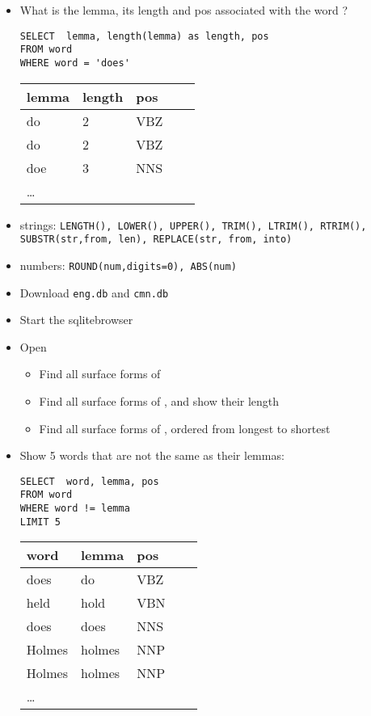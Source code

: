\documentclass[a4paper,landscape,headrule,footrule,xetex]{foils}
\begin{document}

\begin{itemize}\addtolength{\itemsep}{-1ex}
\item What is the lemma, its length and pos associated with the word ?
\begin{verbatim}
SELECT  lemma, length(lemma) as length, pos
FROM word
WHERE word = 'does'
\end{verbatim}
  \begin{tabular}{lllll}
    \textbf{lemma}  & \textbf{length}  &  \textbf{pos} \\ \hline
    do  & 2 &  VBZ \\
    do  & 2 &  VBZ \\
    doe & 3 &  NNS \\
    \ldots
  \end{tabular}
\item strings:  \texttt{LENGTH(), LOWER(), UPPER(), TRIM(), LTRIM(), RTRIM(), SUBSTR(str,from, len), REPLACE(str, from, into)}
\item numbers:  \texttt{ROUND(num,digits=0), ABS(num)}
\end{itemize}


\begin{itemize}
\item Download \texttt{eng.db} and \texttt{cmn.db}
\item Start the sqlitebrowser
\item Open 
  \begin{itemize}
  \item Find all surface forms of 
  \item Find all surface forms of , and show their length
  \item Find all surface forms of , ordered from longest to shortest
  \end{itemize}

\end{itemize}


\begin{itemize}
\item Show 5 words that are not the same as their lemmas:
\begin{verbatim}
SELECT  word, lemma, pos
FROM word
WHERE word != lemma
LIMIT 5
\end{verbatim}
  \begin{tabular}{lllll}
    \textbf{word}  & \textbf{lemma}  &  \textbf{pos} \\ \hline
    does  & do &  VBZ \\
    held  & hold &  VBN \\
    does & does &  NNS \\
    Holmes & holmes & NNP \\
    Holmes & holmes & NNP \\
    \ldots
  \end{tabular}
\end{itemize}
\end{document}
